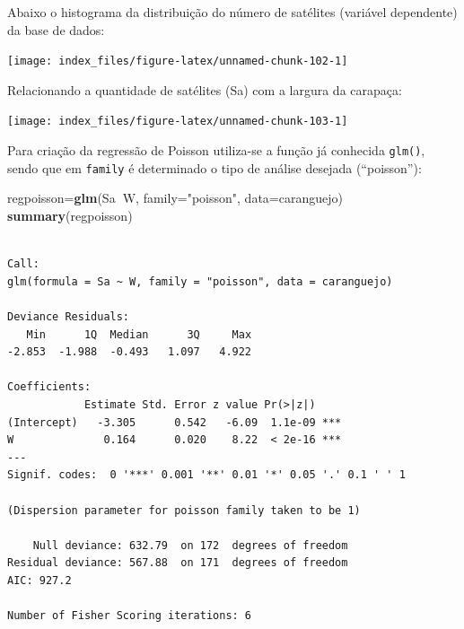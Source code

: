\documentclass[12pt,brazil,oneside]{book}
\newenvironment{Shaded}{\begin{snugshade}}{\end{snugshade}}
\newcommand{\DataTypeTok}[1]{\textcolor[rgb]{0.13,0.29,0.53}{#1}}
\newcommand{\KeywordTok}[1]{\textcolor[rgb]{0.13,0.29,0.53}{\textbf{#1}}}
\newcommand{\NormalTok}[1]{#1}
\newcommand{\OperatorTok}[1]{\textcolor[rgb]{0.81,0.36,0.00}{\textbf{#1}}}
\newcommand{\StringTok}[1]{\textcolor[rgb]{0.31,0.60,0.02}{#1}}
\begin{document}
Abaixo o histograma da distribuição do número de satélites (variável dependente) da base de dados:

\begin{Shaded}
\end{Shaded}

\begin{center}\texttt{[image: index\_files/figure-latex/unnamed-chunk-102-1]} \end{center}

Relacionando a quantidade de satélites (Sa) com a largura da carapaça:

\begin{Shaded}
\end{Shaded}

\begin{center}\texttt{[image: index\_files/figure-latex/unnamed-chunk-103-1]} \end{center}

Para criação da regressão de Poisson utiliza-se a função já conhecida \texttt{glm()}, sendo que em \texttt{family} é determinado o tipo de análise desejada (``poisson''):

\begin{Shaded}
\begin{Highlighting}[]
\NormalTok{regpoisson=}\KeywordTok{glm}\NormalTok{(Sa}\OperatorTok{~}\NormalTok{W, }\DataTypeTok{family=}\StringTok{"poisson"}\NormalTok{, }\DataTypeTok{data=}\NormalTok{caranguejo)}
\KeywordTok{summary}\NormalTok{(regpoisson)}
\end{Highlighting}
\end{Shaded}

\begin{verbatim}

Call:
glm(formula = Sa ~ W, family = "poisson", data = caranguejo)

Deviance Residuals: 
   Min      1Q  Median      3Q     Max  
-2.853  -1.988  -0.493   1.097   4.922  

Coefficients:
            Estimate Std. Error z value Pr(>|z|)    
(Intercept)   -3.305      0.542   -6.09  1.1e-09 ***
W              0.164      0.020    8.22  < 2e-16 ***
---
Signif. codes:  0 '***' 0.001 '**' 0.01 '*' 0.05 '.' 0.1 ' ' 1

(Dispersion parameter for poisson family taken to be 1)

    Null deviance: 632.79  on 172  degrees of freedom
Residual deviance: 567.88  on 171  degrees of freedom
AIC: 927.2

Number of Fisher Scoring iterations: 6
\end{verbatim}
\end{document}
